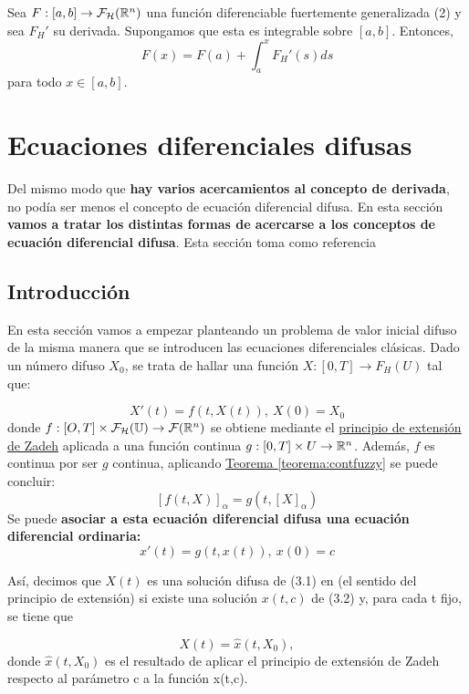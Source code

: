 \begin{teorema}
  Sea $F : [a, b] \rightarrow  \mathcal{F}_\mathcal{H} (\mathbb R^n)$ una función diferenciable fuertemente generalizada (2) y sea $F_H'$ su derivada. Supongamos que esta es integrable sobre $[a, b]$. Entonces,
  \[
  F(x) = F(a) + \int_{a}^{x}F_H'(s) ds
  \]
  para todo $x \in [a, b]$.
\end{teorema}

\section{Ecuaciones diferenciales difusas}
Del mismo modo que \textbf{hay varios acercamientos al concepto de derivada}, no podía ser menos el concepto de ecuación diferencial difusa. En esta sección \textbf{vamos a tratar los distintas formas de acercarse a los conceptos de ecuación diferencial difusa}. Esta sección toma como referencia \cite{fuzzyapproaches}

\subsection{Introducción}
En esta sección vamos a empezar planteando un problema de valor inicial difuso de la misma manera que se introducen las ecuaciones diferenciales clásicas. Dado un número difuso $X_0$, se trata de hallar una función $X:[0,T] \rightarrow F_H(U)$ tal que:

\begin{equation}
  \label{def:edf}
  X'(t) = f(t, X(t)), ~ X(0) = X_0
\end{equation}
donde $f : [O, T] \times \mathcal{F}_\mathcal{H}(\mathbb U) \rightarrow \mathcal{F}(\mathbb R^n)$ se obtiene mediante el \hyperref[def:zadeh]{principio de extensión de Zadeh} aplicada a una función continua $g : [0, T] \times U \rightarrow \mathbb R^n$. Además, $f$  es continua por ser $g$ continua, aplicando \hyperref[teorema:contfuzzy]{Teorema \ref*{teorema:contfuzzy}} se puede concluir:
\[
	[f(t, X)]_\alpha = g(t, [X]_\alpha)
\]
Se puede \textbf{asociar a esta ecuación diferencial difusa una ecuación diferencial ordinaria:}
\begin{equation}
	\label{eq:edo}
	x'(t) = g(t, x(t)), ~ x(0) = c
\end{equation}

Así, decimos que $X(t)$ es una solución difusa de (3.1) en (el sentido del principio de extensión) si existe una solución $x(t,c)$ de (3.2) y, para cada t fijo, se tiene que

\[
X(t) = \hat x (t, X_0),
\]
donde $\hat x(t, X_0)$ es el resultado de aplicar el principio de extensión de Zadeh respecto al parámetro c a la función x(t,c).
